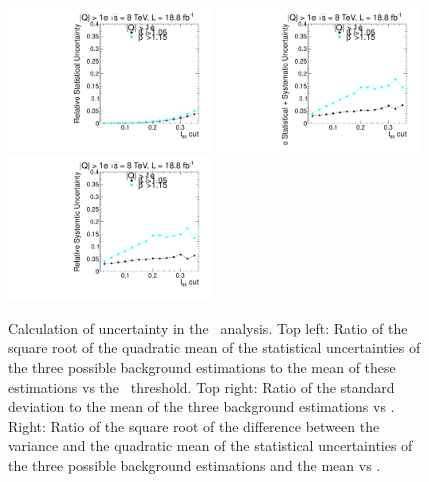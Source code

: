 \begin{figure}
 \begin{center}
 \includegraphics[clip=false, trim=0.0cm 0cm 0.0cm 0cm, width=0.48\textwidth]{figures/multi/Data8TeVCollisionStat}
 \includegraphics[clip=false, trim=0.0cm 0cm 0.0cm 0cm, width=0.48\textwidth]{figures/multi/Data8TeVCollisionStatSyst} \\
 \includegraphics[clip=false, trim=0.0cm 0cm 0.0cm 0cm, width=0.48\textwidth]{figures/multi/Data8TeVCollisionSyst}
\end{center}
\caption[Statistical and systematic uncertainty in the background prediction for different sets of thresholds in the \multi\ analysis]
{
Calculation of uncertainty in the \multi\ analysis.
Top left: Ratio of the square root of the quadratic
mean of the statistical uncertainties of the three possible background
estimations to the mean of these estimations vs
the \ias\ threshold. Top right: Ratio of the standard deviation to the mean of the three
background estimations vs \ias. Right: Ratio of the
square root of the difference between the variance and the quadratic
mean of the statistical uncertainties  of the three possible background
estimations and the mean vs \ias.
}
\label{fig:mCHAMPcorr2}
\end{figure}

